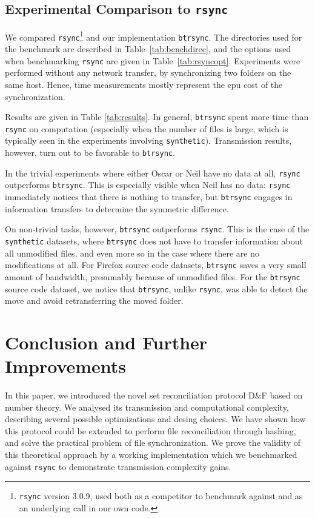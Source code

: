 \documentclass[11pt]{llncs}
\newcommand{\df}{D\&F\xspace}
\newcommand{\btrsync}{\texttt{btrsync}\xspace}
\newcommand{\rsync}{\texttt{rsync}\xspace}
\begin{document}
\subsection{Experimental Comparison to \rsync}

We compared \rsync\footnote{\rsync version 3.0.9, used both as a competitor to
benchmark against and as an underlying call in our own code.} and our implementation \btrsync. The directories used for the
benchmark are described in Table~\ref{tab:benchdirec}, and the options used
when benchmarking \rsync are given in Table~\ref{tab:rsyncopt}. Experiments
were performed without any network transfer, by synchronizing two folders on
the same host. Hence, time measurements mostly represent the {\sc cpu} cost of
the synchronization.

Results are given in Table \ref{tab:results}. In general, \btrsync spent more time than \rsync on computation (especially when the number of files is large, which is typically seen in the experiments involving {\tt synthetic}). Transmission results, however, turn out to be favorable to \btrsync.

In the trivial experiments where either Oscar or Neil have no data at all, \rsync outperforms \btrsync. This is especially visible when Neil has no data: \rsync immediately notices that there is nothing to transfer, but \btrsync engages in information transfers to determine the symmetric
difference.

On non-trivial tasks, however, \btrsync outperforms \rsync. This is the case of the {\tt synthetic} datasets, where \btrsync does not have to transfer
information about all unmodified files, and even more so in the case where there are no modifications at all. For Firefox source code datasets, \btrsync saves a very small amount of bandwidth, presumably because of unmodified files. For the \btrsync source code dataset, we notice that \btrsync, unlike \rsync, was able to detect the move and avoid retransferring the moved folder.

\section{Conclusion and Further Improvements}

In this paper, we introduced the novel set reconciliation protocol \df based on number theory. We analysed its transmission and computational complexity, describing several possible optimizations and desing choices. We have shown how this protocol could be extended to perform file reconciliation through hashing, and solve the practical problem of file synchronization. We prove the validity of this theoretical approach by a working implementation which we benchmarked against \rsync to demonstrate transmission complexity gains.
\end{document}
